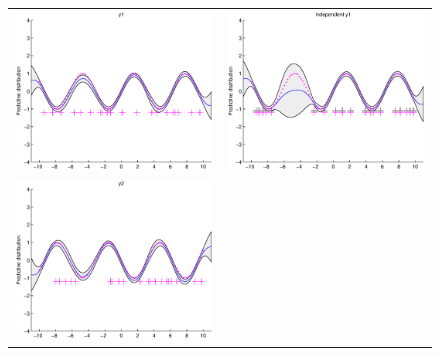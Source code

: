 \documentclass{article} %
\begin{document}
\begin{figure}
\centering
\begin{tabular}{cc}
\includegraphics[scale=0.5]{figures/ssvi2-y1.eps} &
\includegraphics[scale=0.5]{figures/ssvi2-svi1.eps} \\
\includegraphics[scale=0.5]{figures/ssvi2-y2.eps} &

\end{tabular}
\end{figure}
\end{document}
